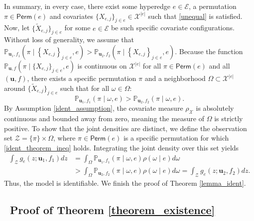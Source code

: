 \documentclass[
  12pt]{article}
\begin{document}
In summary, in every case, there exist some hyperedge $e \in \mathcal{E}$, a permutation $\pi \in \mathsf{Perm}(e)$ and covariates $\{X_{e, j}\}_{j \in e} \in \mathcal{X}^{|e|}$ such that  \eqref{unequal} is satisfied. Now, let \(\{\widetilde{X}_{e, j}\}_{j \in e}\) for some \(e \in \mathcal{E}\) be such specific covariate configurations. Without loss of generality, we assume that $\mathbb{P}_{\boldsymbol{u}_1,f_1}(\pi \mid\left\{X_{e, j}\right\}_{j \in e},e) > \mathbb{P}_{\boldsymbol{u}_2,f_2}(\pi \mid\left\{X_{e, j}\right\}_{j \in e},e)$. Because the function \(\mathbb{P}_{\boldsymbol{u}, f}(\pi \mid \{X_{e, j}\}_{j \in e}, e)\) is continuous on \(\mathcal{X}^{|e|}\) for all \(\pi \in \mathsf{Perm}(e)\) and all \((\boldsymbol{u}, f)\), %
there exists a specific permutation \(\pi\) and a neighborhood \(\Omega \subset \mathcal{X}^{|e|}\) around \(\{\widetilde{X}_{e, j}\}_{j \in e}\) such that for all \(\omega \in \Omega\):
\begin{equation}\label{ident_theorem_ineq}
    \mathbb{P}_{\boldsymbol{u}_1, f_1}(\pi \mid \omega, e) >\mathbb{P}_{\boldsymbol{u}_2, f_2}(\pi \mid \omega, e).
\end{equation}
By Assumption \ref{ident_assumption}, the covariate measure \(\rho_{\mathcal{X}}\) is absolutely continuous and bounded away from zero, meaning the measure of \(\Omega\) is strictly positive. To show that the joint densities are distinct, we define the observation set \(\mathcal{Z} = \{\pi\} \times \Omega\), where $\pi \in \mathsf{Perm}(e)$ is a specific permutation for which \eqref{ident_theorem_ineq} holds. Integrating the joint density over this set yields
$$
\begin{aligned}
\int_{\mathcal{Z}} g_{e}(z ; \boldsymbol{u}_1, f_1) d z & = \int_{\Omega} \mathbb{P}_{\boldsymbol{u}_1, f_1}(\pi \mid \omega, e) \rho(\omega \mid e) d\omega \\
& > \int_{\Omega} \mathbb{P}_{\boldsymbol{u}_2, f_2}(\pi \mid \omega, e) \rho(\omega \mid e) d\omega = \int_{\mathcal{Z}} g_e(z ; \boldsymbol{u}_2, f_2) d z.
\end{aligned}
$$
Thus, the model is identifiable.  We finish the proof of Theorem \ref{lemma_ident}.

\subsection{~Proof of Theorem \ref{theorem_existence}}
\end{document}

